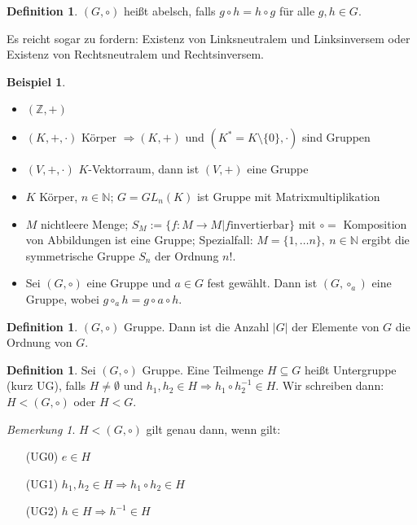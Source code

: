 \documentclass[12pt,a4paper]{article}
\newcounter{defcounter}[subsection]
\theoremstyle{definition}
\newtheorem{defi}[defcounter]{Definition}
\theoremstyle{remark}
\newtheorem*{bem}{Bemerkung}
\theoremstyle{definition}
\theoremstyle{definition}
\newtheorem*{bsp}{Beispiel}
\theoremstyle{plain}
\theoremstyle{plain}
\begin{document}
\begin{defi}
	$(G,\circ)$ heißt abelsch, falls $g\circ h = h\circ g$ für alle $g,h\in G$.
\end{defi}



Es reicht sogar zu fordern: Existenz von Linksneutralem und Linksinversem oder Existenz von Rechtsneutralem und Rechtsinversem.

\begin{bsp}
\leavevmode
\begin{itemize}
	\item $(\mathbb Z, +)$
	\item $(K,+,\cdot)$ Körper $\Rightarrow (K,+)$ und $(K^*=K\setminus \{0\}, \cdot)$ sind Gruppen
	\item $(V,+,\cdot)$ $K$-Vektorraum, dann ist $(V,+)$ eine Gruppe
	\item $K$ Körper, $n\in\mathbb N$; $G = GL_n(K)$ ist Gruppe mit Matrixmultiplikation
	\item $M$ nichtleere Menge; $S_M := \{f\colon M\to M|f \mbox{invertierbar}\}$ mit $\circ = $ Komposition von Abbildungen ist eine Gruppe; Spezialfall: $M = \{1,\dots n\},\ n\in\mathbb N$ ergibt die symmetrische Gruppe $S_n$ der Ordnung $n!$.
	\item Sei $(G,\circ)$ eine Gruppe und $a\in G$ fest gewählt. Dann ist $(G,\circ_a)$ eine Gruppe, wobei $g\circ_a h = g\circ a\circ h$.
\end{itemize}
\end{bsp}

\begin{defi} 
	$(G,\circ)$ Gruppe. Dann ist die Anzahl $|G|$ der Elemente von $G$ die Ordnung von $G$.
\end{defi}

\begin{defi}
	 Sei $(G,\circ)$ Gruppe. Eine Teilmenge $H\subseteq G$ heißt Untergruppe (kurz UG), falls $H\neq\emptyset$ und $h_1,h_2\in H\Rightarrow h_1\circ h_2^{-1}\in H$. Wir schreiben dann: $H<(G,\circ)$ oder $H<G$.
\end{defi}

\begin{bem} $H<(G,\circ)$ gilt genau dann, wenn gilt:
	\begin{enumerate}
	\item[(UG0)] $e\in H$
	\item[(UG1)] $h_1,h_2\in H\Rightarrow h_1\circ h_2\in H$
	\item[(UG2)] $h\in H\Rightarrow h^{-1}\in H$
\end{enumerate}
\end{bem}
\end{document}
